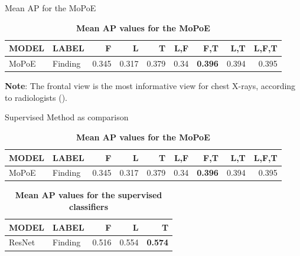     \begin{frame}{Mean AP for the MoPoE}
            \begin{table}
            \centering
            \begin{tabular}{llrrrrrrr}
            MODEL & LABEL &      F &      L &      T &   L,F &    F,T &    L,T &  L,F,T \\
            \midrule
            MoPoE & Finding &  0.345 &  0.317 &  0.379 &  0.34 &  \textbf{0.396} &  0.394 &  0.395 \\
            
            \end{tabular}
            \caption{\textbf{Mean AP values for the MoPoE}}
            \end{table}
    \pause
    \small{\textbf{Note}: The frontal view is the most informative view for chest X-rays, according to radiologists (\cite{kovaleva2020towards}).}
    \end{frame}
    
    \begin{frame}{Supervised Method as comparison}
            \begin{table}
                \centering
            \begin{tabular}{llrrrrrrr}
            MODEL & LABEL &      F &      L &      T &   L,F &    F,T &    L,T &  L,F,T \\
            \midrule
            MoPoE & Finding &  0.345 &  0.317 &  0.379 &  0.34 &  \textbf{0.396} &  0.394 &  0.395 \\
            
            \end{tabular}
            \caption{\textbf{Mean AP values for the MoPoE}}
            \end{table}
            
                        \begin{table}[]
                \centering
            \begin{tabular}{llrrr}
            MODEL & LABEL &      F &      L &      T       \\
            \midrule
            ResNet & Finding &  0.516 &  0.554 &  \textbf{0.574} \\
            \end{tabular}
            \caption{\textbf{Mean AP values for the supervised classifiers}}
            \end{table}
    \end{frame}
    
